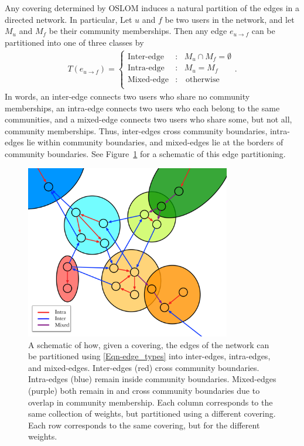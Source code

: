 Any covering determined by OSLOM induces a natural partition of the edges in a directed network. In particular, Let $u$ and $f$ be two users in the network, and let $M_{u}$ and $M_{f}$ be their community memberships. Then any edge $e_{u \to f}$ can be partitioned into one of three classes by
\begin{align}
	T(e_{u \to f}) = \left\{ \begin{array}{ll}
		\text{Inter-edge} &: \ \ \ M_{u} \cap M_{f} = \emptyset \\
		\text{Intra-edge} &: \ \ \ M_{u} = M_{f}\\
		\text{Mixed-edge} &: \ \ \ \text{ otherwise} \\
	\end{array}\right. \label{Eqn-edge_types}.
\end{align}
In words, an inter-edge connects two users who share no community memberships, an intra-edge connects two users who each belong to the same communities, and a mixed-edge connects two users who share some, but not all, community memberships. Thus, inter-edges cross community boundaries, intra-edges lie within community boundaries, and mixed-edges lie at the borders of community boundaries. See Figure~\ref{Fig-edge_types} for a schematic of this edge partitioning.

\begin{figure}[!h]
	\centering
	\includegraphics[width=0.8\textwidth]{edge-types.pdf}
	\caption{A schematic of how, given a covering, the edges of the network can be partitioned using \ref{Eqn-edge_types} into inter-edges, intra-edges, and mixed-edges. Inter-edges (red) cross community boundaries. Intra-edges (blue) remain inside community boundaries. Mixed-edges (purple) both remain in and cross community boundaries due to overlap in community membership. Each column corresponds to the same collection of weights, but partitioned using a different covering. Each row corresponds to the same covering, but for the different weights.}
	\label{Fig-edge_types}
\end{figure}

